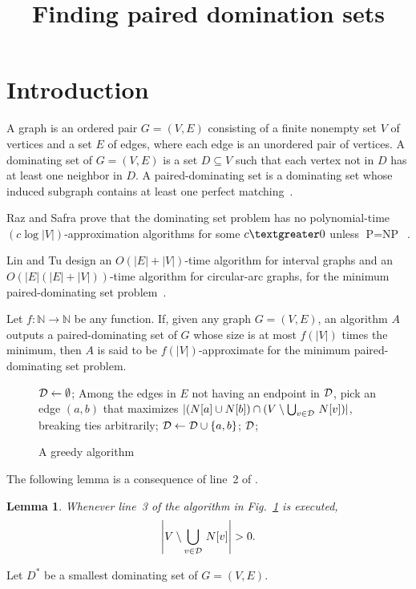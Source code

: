 \documentclass[12pt]{article}
\title{\textbf{Finding paired domination sets }}
\date{}
\begin{document}
\maketitle
\newtheorem{lemma}{Lemma}

\section{Introduction}
A graph is an ordered pair $G=(V,E)$ consisting of a finite nonempty set $V$ of vertices and a set $E$ of edges, where each edge is an unordered pair of vertices. A dominating set of $G=(V,E)$ is a set $D \subseteq V$ such that each vertex not in $D$ has at least one neighbor in $D$. A paired-dominating set is a dominating set whose induced subgraph contains at least one perfect matching~\cite{1}.

Raz and Safra prove that the dominating set problem has no polynomial-time $(c \log|V|)$-approximation algorithms for some $c \textgreater  0$ unless $\text{P}=\text{NP}$~\cite{2}.

Lin and Tu design an $O(|E|+|V|)$-time algorithm for interval graphs and an $O(|E|(|E|+|V|))$-time algorithm for circular-arc graphs, for the minimum paired-dominating set problem~\cite {3}.

Let $f\colon \mathbb{N}\to \mathbb{N}$ be any function. If, given any graph $G=(V,E)$, an algorithm $A$ outputs a paired-dominating set of $G$ whose size is at most $f(|V|)$ times the minimum, then $A$ is said to be $f(|V|)$-approximate for the minimum paired-dominating set problem. 
\clearpage

\begin{figure}
\begin{algorithmic}[1]

\STATE ${\cal D}\leftarrow \emptyset$;
  \STATE Among the edges in $E$ not having an endpoint in ${\cal D}$, pick
an edge $(a,b)$
that maximizes $|(N[a]\cup N[b])\cap (V\setminus \bigcup_{v\in {\cal D}}\,N[v])|$,
breaking ties arbitrarily;
  \STATE ${\cal D}\leftarrow {\cal D}\cup\{a,b\}$;
\ENDWHILE
\RETURN ${\cal D}$;
\end{algorithmic}
\caption{A greedy algorithm}
\label{abc}
\end{figure}

The following lemma is a consequence of line~2 of .
\begin{lemma}
Whenever line~3 of the algorithm in Fig.~\ref{abc} is executed, 
$$
\left|V\setminus \bigcup_{v\in {\cal D}}\,N[v]\right|>0.
$$
\end{lemma}
Let $D^*$ be a smallest dominating set of $G=(V,E)$.
\end{document}
